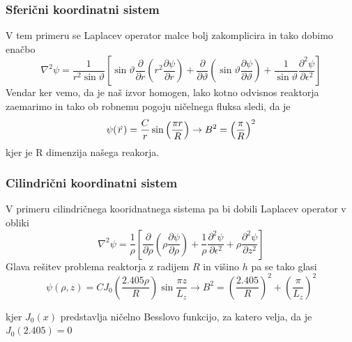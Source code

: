 \documentclass[slovene,11pt,a4paper]{article}
\def\theta{\vartheta}
\renewcommand{\vec}[1]{\overset{\smash{\hbox{\raise -0.42ex\hbox{$\scriptscriptstyle\rightharpoonup$}}}}{#1}}
\begin{document}
\subsubsection{Sferični koordinatni sistem}
V tem primeru se Laplacev operator malce bolj zakomplicira in tako dobimo enačbo
\begin{equation}
\nabla^{2} \psi=\frac{1}{r^{2} \sin \theta}\left[\sin \theta \frac{\partial}{\partial r}\left(r^{2} \frac{\partial \psi}{\partial r}\right)+\frac{\partial}{\partial \theta}\left(\sin \theta \frac{\partial \psi}{\partial \theta}\right)+\frac{1}{\sin \theta} \frac{\partial^{2} \psi}{\partial \epsilon^{2}}\right]
\end{equation}
Vendar ker vemo, da je naš izvor homogen, lako kotno odvisnos reaktorja zaemarimo in tako ob robnemu pogoju ničelnega fluksa sledi, da je 
\begin{equation}
    \psi(\vec{r})=\frac{C}{r}\sin\left(\frac{\pi r}{R}\right) \rightarrow B^2=\left(\frac{\pi}{R}\right)^2
\end{equation}
kjer je R dimenzija našega reakorja. 
\subsubsection{Cilindrični koordinatni sistem}
V primeru cilindričnega kooridnatnega sistema pa bi dobili Laplacev operator v obliki
\begin{equation}
\nabla^{2} \psi=\frac{1}{\rho}\left[\frac{\partial}{\partial \rho}\left(\rho \frac{\partial \psi}{\partial \rho}\right)+\frac{1}{\rho} \frac{\partial^{2} \psi}{\partial \epsilon^{2}}+\rho \frac{\partial^{2} \psi}{\partial z^{2}}\right]
\end{equation}
Glava rešitev problema reaktorja z radijem $R$ in višino $h$ pa se tako glasi
\begin{equation}
\psi(\rho, z)=C J_{0}\left(\frac{2.405 \rho}{R}\right) \sin \frac{\pi z}{L_{z}} \rightarrow 
B^{2}=\left(\frac{2.405}{R}\right)^{2}+\left(\frac{\pi}{L_{z}}\right)^{2}
\end{equation}

kjer $J_0(x)$ predstavlja ničelno Besslovo funkcijo, za katero velja, da je $J_0(2.405)=0$
\end{document}
